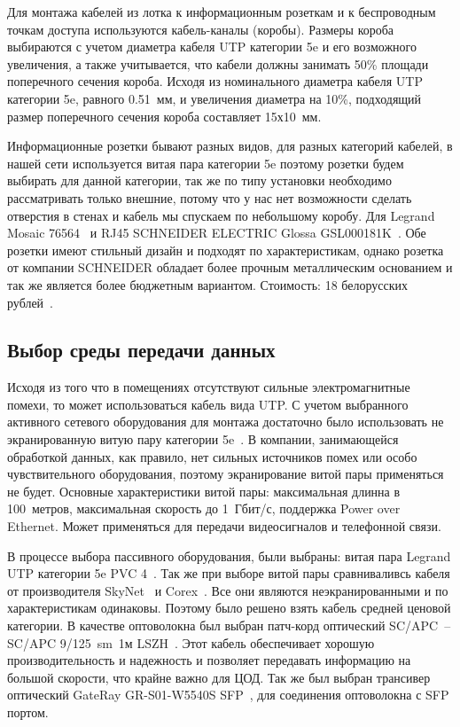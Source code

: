 Для монтажа кабелей из лотка к информационным розеткам и к беспроводным точкам доступа используются кабель-каналы (коробы). Размеры короба выбираются с учетом диаметра кабеля UTP категории 5e и его возможного увеличения, а также учитывается, что кабели должны занимать 50\% площади поперечного сечения короба. Исходя из номинального диаметра кабеля UTP категории 5e, равного 0.51~мм, и увеличения диаметра на 10\%, подходящий размер поперечного сечения короба составляет 15х10~мм.

Информационные розетки бывают разных видов, для разных категорий кабелей, в нашей сети используется витая пара категории 5e поэтому розетки будем выбирать для данной категории, так же по типу установки необходимо рассматривать только внешние, потому что у нас нет возможности сделать отверстия в стенах и кабель мы спускаем по небольшому коробу. Для Legrand Mosaic 76564~\cite{mosaic76564_legrand} и RJ45 SCHNEIDER ELECTRIC Glossa GSL000181K~\cite{glossagsl000181k_schneider_electric}. Обе розетки имеют стильный дизайн и подходят по характеристикам, однако розетка от компании SCHNEIDER обладает более прочным металлическим основанием и так же является более бюджетным вариантом. Стоимость: 18 белорусских рублей~\cite{glossagsl000181k_schneider_electric}.

\subsection{Выбор среды передачи данных}

Исходя из того что в помещениях отсутствуют сильные электромагнитные помехи, то может использоваться кабель вида UTP. С учетом выбранного активного сетевого оборудования для монтажа достаточно было использовать не экранированную витую пару категории 5e~\cite{vitaya_para}. В компании, занимающейся обработкой данных, как правило, нет сильных источников помех или особо чувствительного оборудования, поэтому экранирование витой пары применяться не будет. Основные характеристики витой пары: максимальная длинна в 100~метров, максимальная скорость до 1~Гбит/с, поддержка Power over Ethernet. Может применяться для передачи видеосигналов и телефонной связи. 

В процессе выбора пассивного оборудования, были выбраны: витая пара Legrand UTP категории 5e PVC 4~\cite{kabel-legrand}. Так же при выборе витой пары сравниваливсь кабеля от производителя SkyNet~\cite{kabel-skynet} и Corex~\cite{kabel-corex}. Все они являются неэкранированными и по характеристикам одинаковы. Поэтому было решено взять кабель средней ценовой категории. В качестве оптоволокна был выбран патч-корд оптический SC/APC~-- SC/APC 9/125~sm~1м LSZH~\cite{opticheskiy-simplex-sc-apc-sc-apc}. Этот кабель обеспечивает хорошую производительность и надежность и позволяет передавать информацию на большой скорости, что крайне важно для ЦОД. Так же был выбран трансивер оптический GateRay GR-S01-W5540S SFP~\cite{transivery_opticheskie_gr_s1_w5540s}, для соединения оптоволокна с SFP портом.


